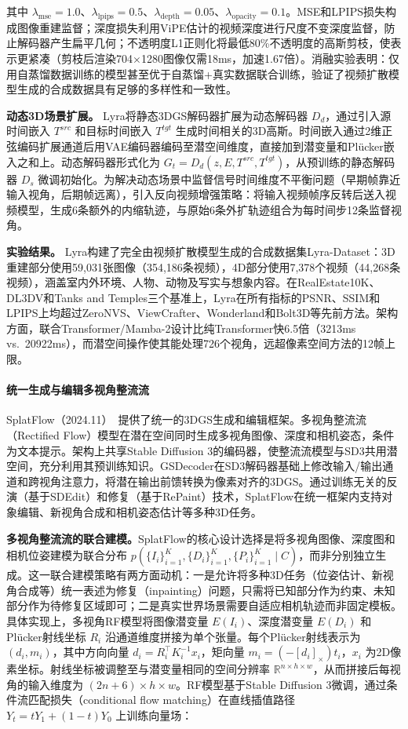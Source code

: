 其中 $\lambda_{\text{mse}}=1.0$、$\lambda_{\text{lpips}}=0.5$、$\lambda_{\text{depth}}=0.05$、$\lambda_{\text{opacity}}=0.1$。MSE和LPIPS损失构成图像重建监督；深度损失利用ViPE估计的视频深度进行尺度不变深度监督，防止解码器产生扁平几何；不透明度L1正则化将最低80\%不透明度的高斯剪枝，使表示更紧凑（剪枝后渲染704$\times$1280图像仅需18ms，加速1.67倍）。消融实验表明：仅用自蒸馏数据训练的模型甚至优于自蒸馏+真实数据联合训练，验证了视频扩散模型生成的合成数据具有足够的多样性和一致性。

\textbf{动态3D场景扩展。}
Lyra将静态3DGS解码器扩展为动态解码器 $D_d$，通过引入源时间嵌入 $T^{src}$ 和目标时间嵌入 $T^{tgt}$ 生成时间相关的3D高斯。时间嵌入通过2维正弦编码扩展通道后用VAE编码器编码至潜空间维度，直接加到潜变量和Pl\"ucker嵌入之和上。动态解码器形式化为 $G_t = D_d(z, E, T^{src}, T^{tgt})$，从预训练的静态解码器 $D_s$ 微调初始化。为解决动态场景中监督信号时间维度不平衡问题（早期帧靠近输入视角，后期帧远离），引入反向视频增强策略：将输入视频帧序反转后送入视频模型，生成6条额外的内缩轨迹，与原始6条外扩轨迹组合为每时间步12条监督视角。

\textbf{实验结果。}
Lyra构建了完全由视频扩散模型生成的合成数据集Lyra-Dataset：3D重建部分使用59,031张图像（354,186条视频），4D部分使用7,378个视频（44,268条视频），涵盖室内外环境、人物、动物及写实与想象内容。在RealEstate10K、DL3DV和Tanks and Temples三个基准上，Lyra在所有指标的PSNR、SSIM和LPIPS上均超过ZeroNVS、ViewCrafter、Wonderland和Bolt3D等先前方法。架构方面，联合Transformer/Mamba-2设计比纯Transformer快6.5倍（3213ms vs.\ 20922ms），而潜空间操作使其能处理726个视角，远超像素空间方法的12帧上限。

\paragraph{统一生成与编辑多视角整流流}

SplatFlow（2024.11）~\cite{2411_16443}提供了统一的3DGS生成和编辑框架。多视角整流流（Rectified Flow）模型在潜在空间同时生成多视角图像、深度和相机姿态，条件为文本提示。架构上共享Stable Diffusion 3的编码器，使整流流模型与SD3共用潜空间，充分利用其预训练知识。GSDecoder在SD3解码器基础上修改输入/输出通道和跨视角注意力，将潜在输出前馈转换为像素对齐的3DGS。通过训练无关的反演（基于SDEdit）和修复（基于RePaint）技术，SplatFlow在统一框架内支持对象编辑、新视角合成和相机姿态估计等多种3D任务。

\textbf{多视角整流流的联合建模。}SplatFlow的核心设计选择是将多视角图像、深度图和相机位姿建模为联合分布 $p(\{I_i\}_{i=1}^K, \{D_i\}_{i=1}^K, \{P_i\}_{i=1}^K \mid C)$，而非分别独立生成。这一联合建模策略有两方面动机：一是允许将多种3D任务（位姿估计、新视角合成等）统一表述为修复（inpainting）问题，只需将已知部分作为约束、未知部分作为待修复区域即可；二是真实世界场景需要自适应相机轨迹而非固定模板。具体实现上，多视角RF模型将图像潜变量 $E(I_i)$、深度潜变量 $E(D_i)$ 和Pl\"ucker射线坐标 $R_i$ 沿通道维度拼接为单个张量。每个Pl\"ucker射线表示为 $(d_i, m_i)$，其中方向向量 $d_i = R_i^\top K_i^{-1} x_i$，矩向量 $m_i = (-[d_i]_\times) t_i$，$x_i$ 为2D像素坐标。射线坐标被调整至与潜变量相同的空间分辨率 $\mathbb{R}^{n \times h \times w}$，从而拼接后每视角的输入维度为 $(2n + 6) \times h \times w$。RF模型基于Stable Diffusion 3微调，通过条件流匹配损失（conditional flow matching）在直线插值路径 $Y_t = tY_1 + (1-t)Y_0$ 上训练向量场：

